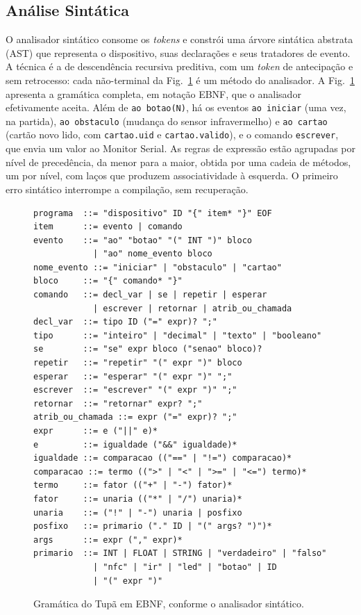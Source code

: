 \documentclass[conference]{IEEEtran}
\begin{document}
\subsection{Análise Sintática}
O analisador sintático consome os \textit{tokens} e constrói uma árvore
sintática abstrata (AST) que representa o dispositivo, suas declarações e
seus tratadores de evento. A técnica é a de descendência recursiva
preditiva, com um \textit{token} de antecipação e sem retrocesso: cada
não-terminal da Fig.~\ref{fig:gramatica} é um método do analisador. A
Fig.~\ref{fig:gramatica} apresenta a gramática completa, em notação EBNF, que
o analisador efetivamente aceita. Além de \texttt{ao botao(N)}, há os eventos
\texttt{ao iniciar} (uma vez, na partida), \texttt{ao obstaculo} (mudança do
sensor infravermelho) e \texttt{ao cartao} (cartão novo lido, com
\texttt{cartao.uid} e \texttt{cartao.valido}), e o comando \texttt{escrever},
que envia um valor ao Monitor Serial. As regras de expressão estão agrupadas
por nível de precedência, da menor para a maior, obtida por uma cadeia de
métodos, um por nível, com laços que produzem associatividade à esquerda. O
primeiro erro sintático interrompe a compilação, sem recuperação.

\begin{figure}[htbp]
\centering
\begin{lstlisting}[basicstyle=\ttfamily\tiny, numbers=none, xleftmargin=0pt, framexleftmargin=0pt]
programa  ::= "dispositivo" ID "{" item* "}" EOF
item      ::= evento | comando
evento    ::= "ao" "botao" "(" INT ")" bloco
            | "ao" nome_evento bloco
nome_evento ::= "iniciar" | "obstaculo" | "cartao"
bloco     ::= "{" comando* "}"
comando   ::= decl_var | se | repetir | esperar
            | escrever | retornar | atrib_ou_chamada
decl_var  ::= tipo ID ("=" expr)? ";"
tipo      ::= "inteiro" | "decimal" | "texto" | "booleano"
se        ::= "se" expr bloco ("senao" bloco)?
repetir   ::= "repetir" "(" expr ")" bloco
esperar   ::= "esperar" "(" expr ")" ";"
escrever  ::= "escrever" "(" expr ")" ";"
retornar  ::= "retornar" expr? ";"
atrib_ou_chamada ::= expr ("=" expr)? ";"
expr      ::= e ("||" e)*
e         ::= igualdade ("&&" igualdade)*
igualdade ::= comparacao (("==" | "!=") comparacao)*
comparacao ::= termo ((">" | "<" | ">=" | "<=") termo)*
termo     ::= fator (("+" | "-") fator)*
fator     ::= unaria (("*" | "/") unaria)*
unaria    ::= ("!" | "-") unaria | posfixo
posfixo   ::= primario ("." ID | "(" args? ")")*
args      ::= expr ("," expr)*
primario  ::= INT | FLOAT | STRING | "verdadeiro" | "falso"
            | "nfc" | "ir" | "led" | "botao" | ID
            | "(" expr ")"
\end{lstlisting}
\caption{Gramática do Tupã em EBNF, conforme o analisador sintático.}
\label{fig:gramatica}
\end{figure}
\end{document}
